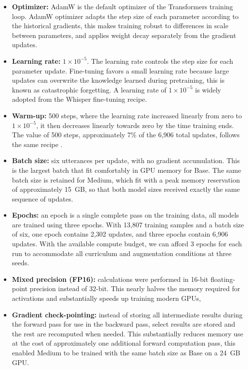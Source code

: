 {\begin{itemize}
    \item \textbf{Optimizer:} AdamW \citep{Loshchilov2019} is the default optimizer
    of the Transformers training loop. AdamW optimizer adapts the step size of each
    parameter according to the historical gradients, this makes training
    robust to differences in scale between parameters, and applies weight decay
    separately from the gradient updates.
    \item \textbf{Learning rate:} $1 \times 10^{-5}$. The learning rate controls
    the step size for each parameter update. Fine-tuning favors a small learning rate because large updates can overwrite the knowledge learned during pretraining, this is known as catastrophic forgetting\citep{Mosbach2021}. A learning rate of 
    $1 \times 10^{-5}$ is widely adopted from the Whisper fine-tuning recipe\citep{Gandhi2022}.
    \item \textbf{Warm-up:} 500 steps, where the learning rate increased
    linearly from zero to $1 \times 10^{-5}$, it then decreases linearly
    towards zero by the time training ends. The value of 500 steps, approximately 7\% of
    the 6,906 total updates, follows the same recipe \citep{Gandhi2022}.
    \item \textbf{Batch size:} six utterances per update, with no gradient
    accumulation. This is the largest batch that fit comfortably in GPU memory
    for Base. The same batch size is retained for Medium, which fit with a
    peak memory reservation of approximately 15~GB, so that both model sizes
    received exactly the same sequence of updates.
    \item \textbf{Epochs:} an epoch is a single complete pass on the training data, all models are trained using three epochs. With 13,807 training samples and a batch size of six, one epoch contains 2,302 updates, and three epochs contain 6,906 updates. With the available compute budget, we can afford 3 epochs for each run to accommodate all curriculum and augmentation conditions at three seeds.
    \item \textbf{Mixed precision (FP16):} calculations were performed in
    16-bit floating-point precision instead of 32-bit. This nearly halves the
    memory required for activations and substantially speeds up training modern
    GPUs, 
    \item \textbf{Gradient check-pointing:} instead of storing all intermediate
    results during the forward pass for use in the backward pass, select
    results are stored and the rest are recomputed when needed. This substantially reduces memory use at the cost of approximately one additional forward
    computation \citep{Chen2016} pass, this enabled Medium to be trained with
    the same batch size as Base on a 24~GB GPU.
\end{itemize}


}
